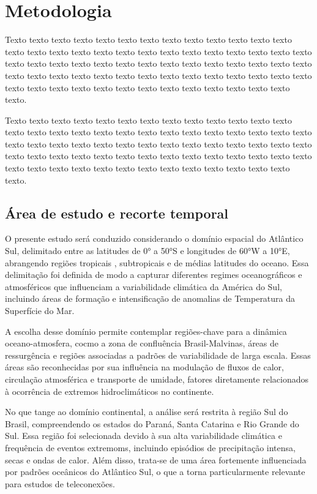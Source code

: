 \chapter{Metodologia}
\label{chap:metodologia}

Texto texto texto texto texto texto texto texto texto texto texto texto texto texto texto texto texto texto texto texto texto texto texto texto texto texto texto texto texto texto texto texto texto texto texto texto texto texto texto texto texto texto texto texto texto texto texto texto texto texto texto texto texto texto texto texto texto texto texto texto texto texto texto texto texto texto texto texto texto.

Texto texto texto texto texto texto texto texto texto texto texto texto texto texto texto texto texto texto texto texto texto texto texto texto texto texto texto texto texto texto texto texto texto texto texto texto texto texto texto texto texto texto texto texto texto texto texto texto texto texto texto texto texto texto texto texto texto texto texto texto texto texto texto texto texto texto texto texto texto.

\section{Área de estudo e recorte temporal}\label{sec:area-estudo}

	O presente estudo será conduzido considerando o domínio espacial do Atlântico Sul, delimitado entre as latitudes de 0° a 50°S e longitudes de 60°W a 10°E, abrangendo regiões tropicais , subtropicais e de médias latitudes do oceano.
	Essa delimitação foi definida de modo a capturar diferentes regimes oceanográficos e atmosféricos que influenciam a variabilidade climática da América do Sul, incluindo áreas de formação e intensificação de anomalias de Temperatura da Superfície do Mar.

	A escolha desse domínio permite contemplar regiões-chave para a dinâmica oceano-atmosfera, cocmo a zona de confluência Brasil-Malvinas, áreas de ressurgência e regiões associadas a padrões de variabilidade de larga escala.
	Essas áreas são reconhecidas por sua influência na modulação de fluxos de calor, circulação atmosférica e transporte de umidade, fatores diretamente relacionados à ocorrência de extremos hidroclimáticos no continente.

	No que tange ao domínio continental, a análise será restrita à região Sul do Brasil, compreendendo os estados do Paraná, Santa Catarina e Rio Grande do Sul. Essa região foi selecionada devido à sua alta variabilidade climática e frequência de eventos extremoms, incluindo episódios de precipitação intensa, secas e ondas de calor.
	Além disso, trata-se de uma área fortemente influenciada por padrões oceânicos do Atlântico Sul, o que a torna particularmente relevante para estudos de teleconexões.

